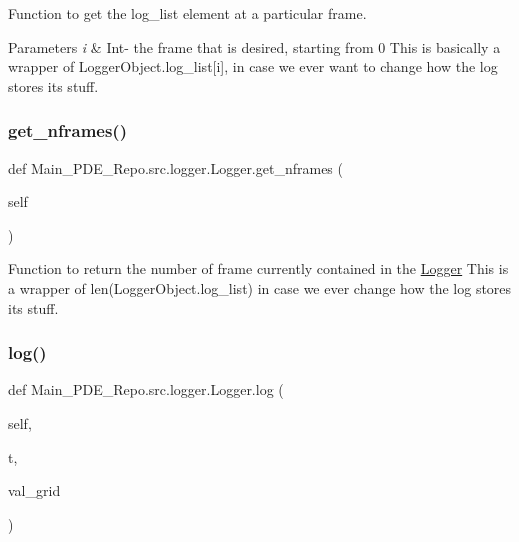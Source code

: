 Function to get the log\+\_\+list element at a particular frame. 


\begin{DoxyParams}{Parameters}
{\em i} & Int-\/ the frame that is desired, starting from 0 This is basically a wrapper of Logger\+Object.\+log\+\_\+list\mbox{[}i\mbox{]}, in case we ever want to change how the log stores its stuff. \\
\hline
\end{DoxyParams}
\mbox{\label{classMain__PDE__Repo_1_1src_1_1logger_1_1Logger_a3a9c0a4d4efcc23c16de9f19652cb552}} 
\subsubsection{\texorpdfstring{get\+\_\+nframes()}{get\_nframes()}}
{\footnotesize\ttfamily def Main\+\_\+\+P\+D\+E\+\_\+\+Repo.\+src.\+logger.\+Logger.\+get\+\_\+nframes (\begin{DoxyParamCaption}\item[{}]{self }\end{DoxyParamCaption})}



Function to return the number of frame currently contained in the \hyperlink{classMain__PDE__Repo_1_1src_1_1logger_1_1Logger}{Logger} This is a wrapper of len(Logger\+Object.\+log\+\_\+list) in case we ever change how the log stores its stuff. 

\mbox{\label{classMain__PDE__Repo_1_1src_1_1logger_1_1Logger_a5028b1f1929f7124fc5322aaa917f118}} 
\subsubsection{\texorpdfstring{log()}{log()}}
{\footnotesize\ttfamily def Main\+\_\+\+P\+D\+E\+\_\+\+Repo.\+src.\+logger.\+Logger.\+log (\begin{DoxyParamCaption}\item[{}]{self,  }\item[{}]{t,  }\item[{}]{val\+\_\+grid }\end{DoxyParamCaption})}



